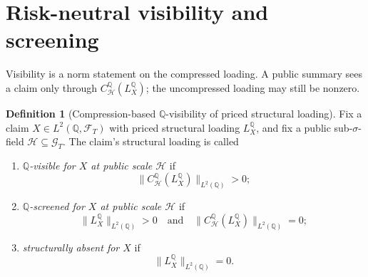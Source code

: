 \documentclass[11pt,a4paper]{amsart}
\theoremstyle{plain}
\theoremstyle{definition}
\newtheorem{definition}[theorem]{Definition}
\theoremstyle{remark}
\newcommand{\QQ}{\mathbb{Q}}
\newcommand{\cF}{\mathcal{F}}
\newcommand{\cG}{\mathcal{G}}
\newcommand{\cH}{\mathcal{H}}
\begin{document}
\section{Risk-neutral visibility and screening}\label{sec:class}

Visibility is a norm statement on the compressed loading.  A public summary sees a claim only
through \(C_{\cH}^{\QQ}(L_X^\QQ)\); the uncompressed loading may still be nonzero.

\begin{definition}[Compression-based \(\QQ\)-visibility of priced structural loading]\label{def:q-visible}
Fix a claim \(X\in L^2(\QQ,\cF_T)\) with priced structural loading \(L_X^\QQ\), and fix a public
sub-\(\sigma\)-field \(\cH\subseteq \cG_T\).  The claim's structural loading is called
\begin{enumerate}[label=(\roman*)]
\item \emph{\(\QQ\)-visible for \(X\) at public scale \(\cH\)} if
\[
        \|C_{\cH}^{\QQ}(L_X^\QQ)\|_{L^2(\QQ)}>0;
\]
\item \emph{\(\QQ\)-screened for \(X\) at public scale \(\cH\)} if
\[
        \|L_X^\QQ\|_{L^2(\QQ)}>0
        \quad\text{and}\quad
        \|C_{\cH}^{\QQ}(L_X^\QQ)\|_{L^2(\QQ)}=0;
\]
\item \emph{structurally absent for \(X\)} if
\[
        \|L_X^\QQ\|_{L^2(\QQ)}=0.
\]
\end{enumerate}
\end{definition}
\end{document}
